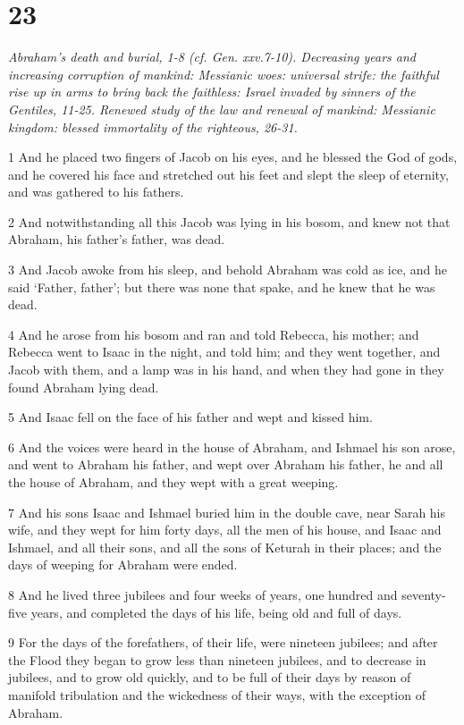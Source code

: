 \chapter{23}

\par \textit{Abraham's death and burial, 1-8 (cf. Gen. xxv.7-10). Decreasing years and increasing corruption of mankind: Messianic woes: universal strife: the faithful rise up in arms to bring back the faithless: Israel invaded by sinners of the Gentiles, 11-25. Renewed study of the law and renewal of mankind: Messianic kingdom: blessed immortality of the righteous, 26-31.}

\par 1 And he placed two fingers of Jacob on his eyes, and he blessed the God of gods, and he covered his face and stretched out his feet and slept the sleep of eternity, and was gathered to his fathers.
\par 2 And notwithstanding all this Jacob was lying in his bosom, and knew not that Abraham, his father's father, was dead.
\par 3 And Jacob awoke from his sleep, and behold Abraham was cold as ice, and he said ‘Father, father’; but there was none that spake, and he knew that he was dead.
\par 4 And he arose from his bosom and ran and told Rebecca, his mother; and Rebecca went to Isaac in the night, and told him; and they went together, and Jacob with them, and a lamp was in his hand, and when they had gone in they found Abraham lying dead.
\par 5 And Isaac fell on the face of his father and wept and kissed him.
\par 6 And the voices were heard in the house of Abraham, and Ishmael his son arose, and went to Abraham his father, and wept over Abraham his father, he and all the house of Abraham, and they wept with a great weeping.
\par 7 And his sons Isaac and Ishmael buried him in the double cave, near Sarah his wife, and they wept for him forty days, all the men of his house, and Isaac and Ishmael, and all their sons, and all the sons of Keturah in their places; and the days of weeping for Abraham were ended.
\par 8 And he lived three jubilees and four weeks of years, one hundred and seventy-five years, and completed the days of his life, being old and full of days.
\par 9 For the days of the forefathers, of their life, were nineteen jubilees; and after the Flood they began to grow less than nineteen jubilees, and to decrease in jubilees, and to grow old quickly, and to be full of their days by reason of manifold tribulation and the wickedness of their ways, with the exception of Abraham.

